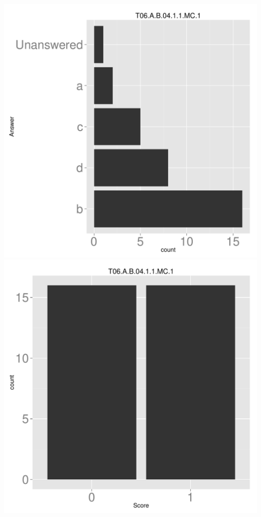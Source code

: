 \documentclass[12pt,nohyper]{tufte-handout}\usepackage[]{graphicx}\usepackage[]{color}
\begin{document}
\begin{center} \includegraphics[width=.45\linewidth]{Topic06_5_answer} \includegraphics[width=.45\linewidth]{Topic06_5_score} \end{center} 
\end{document}
